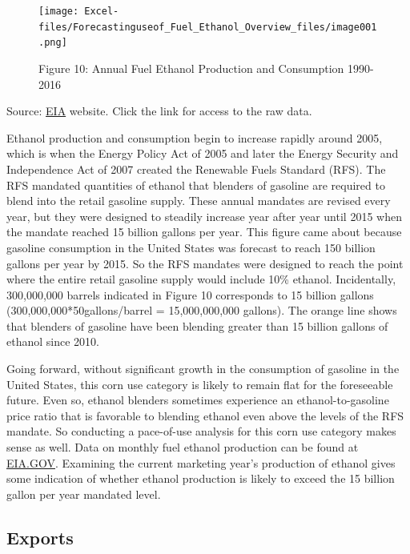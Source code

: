\documentclass[
]{book}
\begin{document}
\begin{figure}
\centering
\texttt{[image: Excel-files/Forecastinguseof\_Fuel\_Ethanol\_Overview\_files/image001.png]}
\caption{Figure 10: Annual Fuel Ethanol Production and Consumption 1990-2016}
\end{figure}

Source: \href{http://www.eia.gov/totalenergy/data/monthly/\#renewable}{EIA} website. Click the link for access to the raw data.

Ethanol production and consumption begin to increase rapidly around 2005, which is when the Energy Policy Act of 2005 and later the Energy Security and Independence Act of 2007 created the Renewable Fuels Standard (RFS). The RFS mandated quantities of ethanol that blenders of gasoline are required to blend into the retail gasoline supply. These annual mandates are revised every year, but they were designed to steadily increase year after year until 2015 when the mandate reached 15 billion gallons per year. This figure came about because gasoline consumption in the United States was forecast to reach 150 billion gallons per year by 2015. So the RFS mandates were designed to reach the point where the entire retail gasoline supply would include 10\% ethanol. Incidentally, 300,000,000 barrels indicated in Figure 10 corresponds to 15 billion gallons (300,000,000*50gallons/barrel = 15,000,000,000 gallons). The orange line shows that blenders of gasoline have been blending greater than 15 billion gallons of ethanol since 2010.

Going forward, without significant growth in the consumption of gasoline in the United States, this corn use category is likely to remain flat for the foreseeable future. Even so, ethanol blenders sometimes experience an ethanol-to-gasoline price ratio that is favorable to blending ethanol even above the levels of the RFS mandate. So conducting a pace-of-use analysis for this corn use category makes sense as well. Data on monthly fuel ethanol production can be found at \href{http://www.eia.gov/totalenergy/data/monthly/\#renewable}{EIA.GOV}. Examining the current marketing year's production of ethanol gives some indication of whether ethanol production is likely to exceed the 15 billion gallon per year mandated level.

\hypertarget{exports-1}{%
\subsection{Exports}\label{exports-1}}
\end{document}
